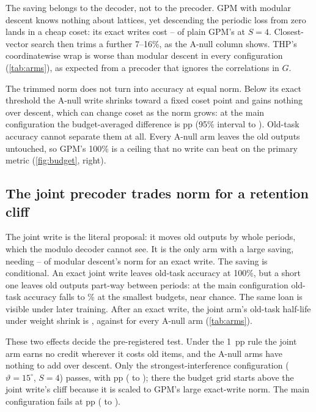 The saving belongs to the decoder, not to the precoder.
GPM with modular descent knows nothing about lattices, yet descending the periodic loss from zero lands in a cheap coset: its exact writes cost \gdgpmSfourmin--\gdgpmSfourmax{} of plain GPM's at \(S=4\).
Closest-vector search then trims a further 7--16\%, as the A-null column shows.
THP's coordinatewise wrap is worse than modular descent in every configuration (\cref{tab:arms}), as expected from a precoder that ignores the correlations in \(G\).

The trimmed norm does not turn into accuracy at equal norm.
Below its exact threshold the A-null write shrinks toward a fixed coset point and gains nothing over descent, which can change coset as the norm grows: at the main configuration the budget-averaged difference is \mainVPGD{} pp (95\% interval \mainVPGDLo{} to \mainVPGDHi{}).
Old-task accuracy cannot separate them at all.
Every A-null arm leaves the old outputs untouched, so GPM's 100\% is a ceiling that no write can beat on the primary metric (\cref{fig:budget}, right).

\subsection{The joint precoder trades norm for a retention cliff}

The joint write is the literal proposal: it moves old outputs by whole periods, which the modulo decoder cannot see.
It is the only arm with a large saving, needing \vjgdmin--\vjgdmax{} of modular descent's norm for an exact write.
The saving is conditional.
An exact joint write leaves old-task accuracy at 100\%, but a short one leaves old outputs part-way between periods: at the main configuration old-task accuracy falls to \jointAmin\% at the smallest budgets, near chance.
The same loan is visible under later training.
After an exact write, the joint arm's old-task half-life under weight shrink is \hlAjoint{}, against \hlAgpm{} for every A-null arm (\cref{tab:arms}).

These two effects decide the pre-registered test.
Under the 1~pp rule the joint arm earns no credit wherever it costs old items, and the A-null arms have nothing to add over descent.
Only the strongest-interference configuration (\(\vartheta=15^\circ\), \(S=4\)) passes, with \hardDelta{} pp (\hardDeltaLo{} to \hardDeltaHi{}); there the budget grid starts above the joint write's cliff because it is scaled to GPM's large exact-write norm.
The main configuration fails at \mainDelta{} pp (\mainDeltaLo{} to \mainDeltaHi{}).

